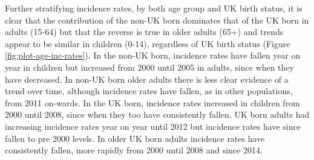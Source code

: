 \documentclass[11pt,twoside]{bristolthesis}
\begin{document}
  Further stratifying incidence rates, by both age group and UK birth status, it is clear that the contribution of the non-UK born dominates that of the UK born in adults (15-64) but that the reverse is true in older adults (65+) and trends appear to be similar in children (0-14), regardless of UK birth status (Figure \ref{fig:plot-age-inc-rates}). In the non-UK born, incidence rates have fallen year on year in children but increased from 2000 until 2005 in adults, since when they have decreased. In non-UK born older adults there is less clear evidence of a trend over time, although incidence rates have fallen, as in other populations, from 2011 on-wards. In the UK born, incidence rates increased in children from 2000 until 2008, since when they too have consistently fallen. UK born adults had increasing incidence rates year on year until 2012 but incidence rates have since fallen to pre 2000 levels. In older UK born adults incidence rates have consistently fallen, more rapidly from 2000 until 2008 and since 2014.
\end{document}
